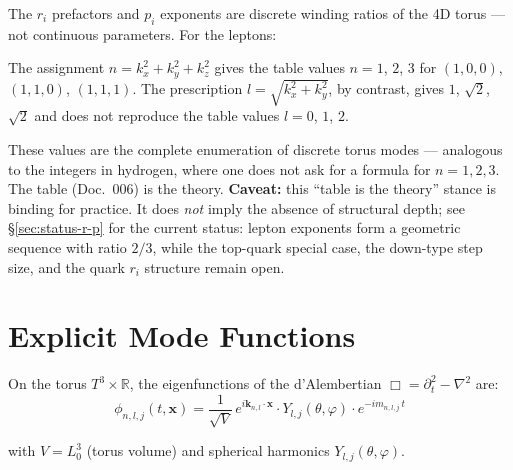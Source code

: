 The $r_i$ prefactors and $p_i$ exponents are discrete winding ratios
of the 4D torus — not continuous parameters. For the leptons:

\begin{center}
{\footnotesize
{}
}
\end{center}
\noindent The assignment $n = k_x^2 + k_y^2 + k_z^2$ gives the table values $n = 1$, $2$, $3$ for $(1,0,0)$, $(1,1,0)$, $(1,1,1)$. The prescription $l = \sqrt{k_x^2 + k_y^2}$, by contrast, gives $1$, $\sqrt2$, $\sqrt2$ and does not reproduce the table values $l = 0$, $1$, $2$.

These values are the complete enumeration of discrete torus modes —
analogous to the integers in hydrogen, where one does not ask for
a formula for $n=1,2,3$. The table (Doc.~006) is the theory.
\textbf{Caveat:} this \enquote{table is the theory} stance is binding
for practice. It does \emph{not} imply the absence of structural
depth; see §\ref{sec:status-r-p} for the current status: lepton
exponents form a geometric sequence with ratio $2/3$,
while the top-quark special case, the down-type step size, and the
quark $r_i$ structure remain open.

\section{Explicit Mode Functions}

On the torus $T^3 \times \mathbb{R}$, the eigenfunctions of the
d'Alembertian $\Box = \partial_t^2 - \nabla^2$ are:
\begin{equation}
  \boxed{
    \phi_{n,l,j}(t,\mathbf{x})
    = \frac{1}{\sqrt{V}}\,
      e^{i\mathbf{k}_{n,l}\cdot\mathbf{x}} \cdot
      Y_{l,j}(\theta,\varphi) \cdot
      e^{-im_{n,l,j}\,t}
  }
\end{equation}

with $V = L_0^3$ (torus volume) and spherical harmonics $Y_{l,j}(\theta,\varphi)$.

